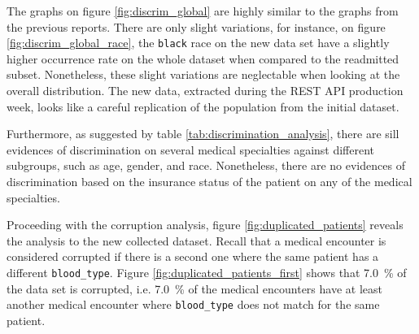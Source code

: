 \documentclass[a4paper,11pt]{article}
\newcommand{\bloodType}{\texttt{blood\_type}\xspace}
\begin{document}
The graphs on figure \ref{fig:discrim_global} are highly similar to the graphs from the previous reports. There are only slight variations, for instance, on figure \ref{fig:discrim_global_race}, the \texttt{black} race on the new data set have a slightly higher occurrence rate on the whole dataset when compared to the readmitted subset. Nonetheless, these slight variations are neglectable when looking at the overall distribution. The new data, extracted during the REST API production week, looks like a careful replication of the population from the initial dataset.

Furthermore, as suggested by table \ref{tab:discrimination_analysis}, there are sill evidences of discrimination on several medical specialties against different subgroups, such as age, gender, and race. Nonetheless, there are no evidences of discrimination based on the insurance status of the patient on any of the medical specialties.

Proceeding with the corruption analysis, figure \ref{fig:duplicated_patients} reveals the analysis to the new collected dataset. Recall that a medical encounter is considered corrupted if there is a second one where the same patient has a different \bloodType.
Figure \ref{fig:duplicated_patients_first} shows that \SI{7.0}{\percent} of the data set is corrupted, i.e. \SI{7.0}{\percent} of the medical encounters have at least another medical encounter where \bloodType does not match for the same patient.
\end{document}
